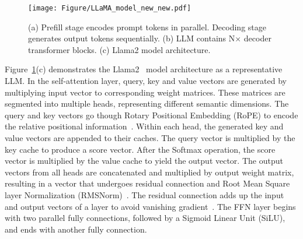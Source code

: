 \begin{figure}[t]
    \centering
    \texttt{[image: Figure/LLaMA\_model\_new\_new.pdf]}
    \caption{(a) Prefill stage encodes prompt tokens in parallel. Decoding stage generates output tokens sequentially.
    (b) LLM contains N$\times$ decoder transformer blocks. 
    (c) Llama2 model architecture.}
    \label{fig:LLaMA_model}
\end{figure}

Figure~\ref{fig:LLaMA_model}(c) demonstrates the Llama2~\cite{touvron2023llama} model architecture as a representative LLM.
In the self-attention layer, query, key and value vectors are generated by multiplying input vector to corresponding weight matrices.
These matrices are segmented into multiple heads, representing different semantic dimensions.
The query and key vectors go though Rotary Positional Embedding (RoPE) to encode the relative positional information~\cite{rope-paper}.
Within each head, the generated key and value vectors are appended to their caches.
The query vector is multiplied by the key cache to produce a score vector.
After the Softmax operation, the score vector is multiplied by the value cache to yield the output vector.
The output vectors from all heads are concatenated and multiplied by output weight matrix, resulting in a vector that undergoes residual connection and Root Mean Square layer Normalization (RMSNorm)~\cite{rmsnorm-paper}.
The residual connection adds up the input and output vectors of a layer to avoid vanishing gradient~\cite{he2016deep}.
The FFN layer begins with two parallel fully connections, followed by a Sigmoid Linear Unit (SiLU), and ends with another fully connection.